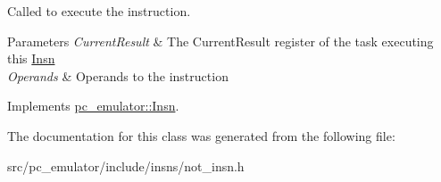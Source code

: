 Called to execute the instruction. 


\begin{DoxyParams}{Parameters}
{\em Current\+Result} & The Current\+Result register of the task executing this \hyperlink{classpc__emulator_1_1Insn}{Insn} \\
\hline
{\em Operands} & Operands to the instruction \\
\hline
\end{DoxyParams}


Implements \hyperlink{classpc__emulator_1_1Insn_a103d27030e872a799e313df16c1f3d66}{pc\+\_\+emulator\+::\+Insn}.



The documentation for this class was generated from the following file\+:\begin{DoxyCompactItemize}
\item 
src/pc\+\_\+emulator/include/insns/not\+\_\+insn.\+h\end{DoxyCompactItemize}
